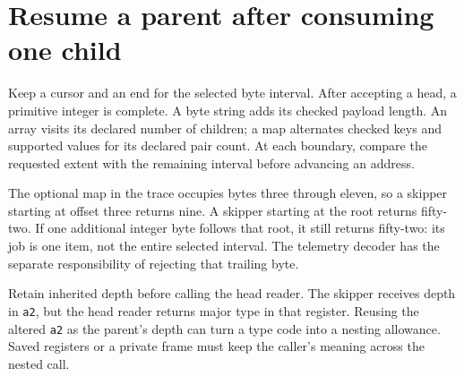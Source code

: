 \section{Resume a parent after consuming one child}
Keep a cursor and an end for the selected byte interval. After accepting a head, a
primitive integer is complete. A byte string adds its checked payload length. An array
visits its declared number of children; a map alternates checked keys and supported
values for its declared pair count. At each boundary, compare the requested extent
with the remaining interval before advancing an address.

The optional map in the trace occupies bytes three through eleven, so a skipper
starting at offset three returns nine. A skipper starting at the root returns fifty-two.
If one additional integer byte follows that root, it still returns fifty-two: its job
is one item, not the entire selected interval. The telemetry decoder has the separate
responsibility of rejecting that trailing byte.

Retain inherited depth before calling the head reader. The skipper receives depth in
\texttt{a2}, but the head reader returns major type in that register. Reusing the altered
\texttt{a2} as the parent's depth can turn a type code into a nesting allowance. Saved
registers or a private frame must keep the caller's meaning across the nested call.
